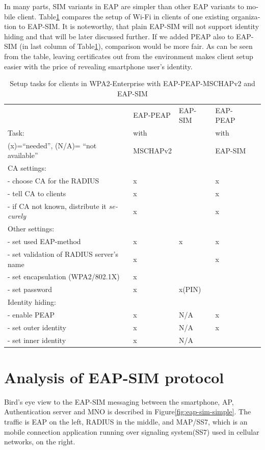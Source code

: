 \documentclass[12pt,a4paper,english]{tutthesis}
\begin{document}
\begin{otherlanguage}{english}
In many parts, SIM variants in EAP are simpler than other EAP
variants to mobile client.  Table\ref{table-peapsim} compares the setup of Wi-Fi
in clients of one existing organization to EAP-SIM. It
is noteworthy, that plain EAP-SIM will not support identity hiding and
that will be later discussed further. If we added PEAP
also to EAP-SIM (in last column of Table\ref{table-peapsim}), comparison would be more fair.
As can be seen from the table, leaving certificates out from the environment
makes client setup easier with the price of revealing smartphone user's
identity.  



\begin{table}[htb]
\caption{\label{table-peapsim}Setup tasks for clients in WPA2-Enterprise with EAP-PEAP-MSCHAPv2 and EAP-SIM}
\centering
\begin{tabular}{|l|l|l|ll|}
\hline
 & EAP-PEAP & EAP-SIM & EAP-PEAP & \\
Task: & with &  & with & \\
(x)=``needed'', (N/A)= ``not available'' & MSCHAPv2 &  & EAP-SIM & \\
\hline
CA settings: &  &  &  & \\
- choose CA for the RADIUS & x &  & x & \\
- tell CA to clients & x &  & x & \\
- if CA not known, distribute it \emph{securely} & x &  & x & \\
\hline
Other settings: &  &  &  & \\
- set used EAP-method & x & x & x & \\
- set validation of RADIUS server's name & x &  & x & \\
- set encapsulation (WPA2/802.1X) & x &  &  & \\
- set password & x & x(PIN) &  & \\
\hline
Identity hiding: &  &  &  & \\
- enable PEAP & x & N/A & x & \\
- set outer identity & x & N/A & x & \\
- set inner identity & x & N/A &  & \\
\hline
\end{tabular}
\end{table}

\section{Analysis of EAP-SIM protocol}
\label{sec-2-6}
Bird's eye view to the EAP-SIM messaging between the smartphone, AP,
Authentication server and MNO is described in Figure\ref{fig:eap-sim-simple}.
The traffic is EAP on the left, RADIUS  in
the middle, and MAP/SS7, which is an mobile connection  application running over signaling system(SS7) used in cellular networks,
on the right.


\end{otherlanguage}
\end{document}
